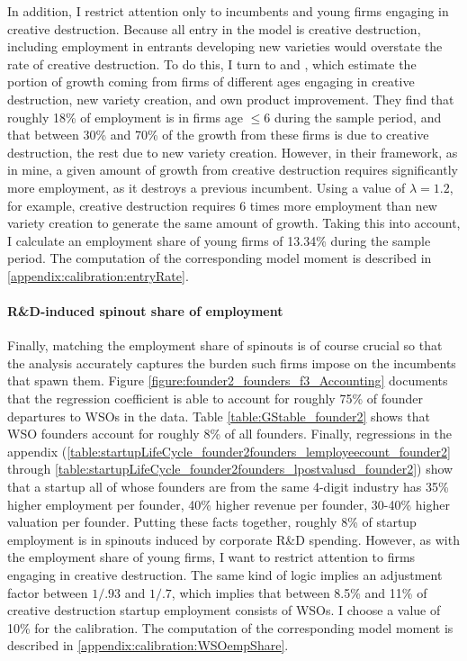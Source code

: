 \documentclass[11pt,english]{article}
\begin{document}
In addition, I restrict attention only to incumbents and young firms engaging in creative destruction. Because all entry in the model is creative destruction, including employment in entrants developing new varieties would overstate the rate of creative destruction. To do this, I turn to \cite{garcia-macia_how_2019} and \cite{klenow_innovative_2020}, which estimate the portion of growth coming from firms of different ages engaging in creative destruction, new variety creation, and own product improvement. They find that roughly 18\% of employment is in firms age $\le 6$ during the sample period, and that between 30\% and 70\% of the growth from these firms is due to creative destruction, the rest due to new variety creation. However, in their framework, as in mine, a given amount of growth from creative destruction requires significantly more employment, as it destroys a previous incumbent. Using a value of $\lambda = 1.2$, for example, creative destruction requires 6 times more employment than new variety creation to generate the same amount of growth. Taking this into account, I calculate an employment share of young firms of 13.34\% during the sample period. The computation of the corresponding model moment is described in \ref{appendix:calibration:entryRate}.
 
\paragraph{R\&D-induced spinout share of employment}

Finally, matching the employment share of spinouts is of course crucial so that the analysis accurately captures the burden such firms impose on the incumbents that spawn them. Figure \ref{figure:founder2_founders_f3_Accounting} documents that the regression coefficient is able to account for roughly 75\% of founder departures to WSOs in the data. Table \ref{table:GStable_founder2} shows that WSO founders account for roughly 8\% of all founders. Finally, regressions in the appendix (\ref{table:startupLifeCycle_founder2founders_lemployeecount_founder2} through \ref{table:startupLifeCycle_founder2founders_lpostvalusd_founder2}) show that a startup all of whose founders are from the same 4-digit industry has 35\% higher employment per founder, 40\% higher revenue per founder, 30-40\% higher valuation per founder. Putting these facts together, roughly 8\% of startup employment is in spinouts induced by corporate R\&D spending. However, as with the employment share of young firms, I want to restrict attention to firms engaging in creative destruction. The same kind of logic implies an adjustment factor between $1/.93$ and $1/.7$, which implies that between 8.5\% and 11\% of creative destruction startup employment consists of WSOs. I choose a value of 10\% for the calibration. The computation of the corresponding model moment is described in \ref{appendix:calibration:WSOempShare}.
\end{document}
